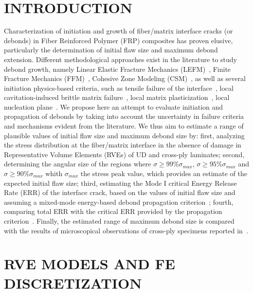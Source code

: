 \documentclass[12pt,a4paper]{article}
\begin{document}
\section{INTRODUCTION}

Characterization of initiation and growth of fiber/matrix interface cracks (or debonds) in Fiber Reinforced Polymer (FRP) composites has proven elusive, particularly the determination of initial flaw size and maximum debond extension. Different methodological approaches exist in the literature to study debond growth, namely Linear Elastic Fracture Mechanics (LEFM)~\cite{Paris2007}, Finite Fracture Mechanics (FFM)~\cite{Mantic2009}, Cohesive Zone Modeling (CSM)~\cite{Canal2012}, as well as several initiation physics-based criteria, such as tensile failure of the interface~\cite{Paris2007}, local cavitation-induced brittle matrix failure~\cite{Asp1996a,Asp1996b}, local matrix plasticization~\cite{Canal2012}, local nucleation plane~\cite{Carraro2014}. We propose here an attempt to evaluate initiation and propagation of debonds by taking into account the uncertainty in failure criteria and mechanisms evident from the literature. We thus aim to estimate a range of plausible values of initial flaw size and maximum debond size by: first, analyzing the stress distribution at the fiber/matrix interface in the absence of damage in Representative Volume Elements (RVEs) of UD and cross-ply laminates; second, determining the angular size of the regions where $\sigma\geq99\%\sigma_{max}$, $\sigma\geq95\%\sigma_{max}$ and $\sigma\geq90\%\sigma_{max}$ whith $\sigma_{max}$ the stress peak value, which provides an estimate of the expected initial flaw size; third, estimating the Mode I critical Energy Release Rate (ERR) of the interface crack, based on the values of initial flaw size and assuming a mixed-mode energy-based debond propagation criterion~\cite{Hutchinson1991}; fourth, comparing total ERR with the critical ERR provided by the propagation criterion~\cite{Hutchinson1991}. Finally, the estimated range of maximum debond size is compared with the results of microscopical observations of cross-ply specimens reported in~\cite{Correa2018}.

\section{RVE MODELS AND FE DISCRETIZATION}
\end{document}
